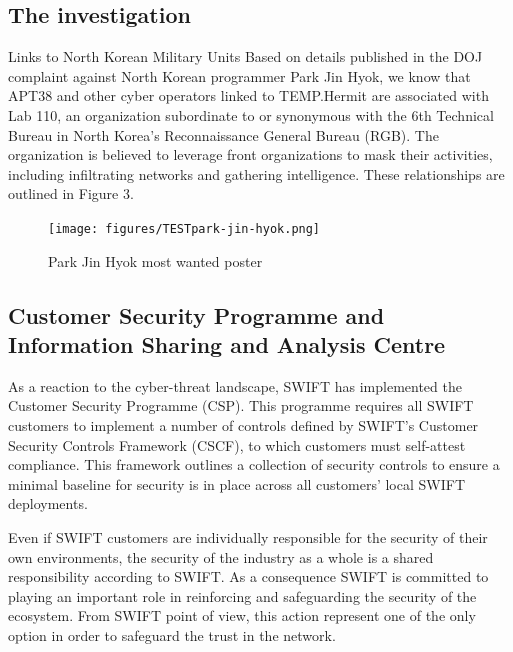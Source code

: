 \documentclass[12pt]{article}
\begin{document}
         \cite{}\cite{}\cite{}

        \subsection{The investigation}
        
        Links to North Korean Military Units
        Based on details published in the DOJ complaint against North Korean programmer Park Jin Hyok, we know that APT38 and other cyber operators linked to TEMP.Hermit are associated with Lab 110, an organization subordinate to or synonymous with the 6th Technical Bureau in North Korea's Reconnaissance General Bureau (RGB). The organization is believed to leverage front organizations to mask their activities, including infiltrating networks and gathering intelligence. These relationships are outlined in Figure 3.
        
         \cite{}\cite{}\cite{}
         
        \begin{figure}[H]
        \centering
        \texttt{[image: figures/TESTpark-jin-hyok.png]}
        \caption{Park Jin Hyok most wanted poster}
        \label{fig:structure}
        \end{figure}
       
        \subsection{Customer Security Programme and Information Sharing and Analysis Centre}
        
        As a reaction to the cyber-threat landscape, SWIFT has implemented the Customer Security Programme (CSP). This programme requires all SWIFT customers to implement a number of controls defined by SWIFT’s Customer Security Controls Framework (CSCF), to which customers must self-attest compliance. This framework outlines a collection of security controls to ensure a minimal baseline for security is in place across all customers’ local SWIFT deployments.
        
        Even if SWIFT customers are individually responsible for the security of their own environments, the security of the industry as a whole is a shared responsibility according to SWIFT. As a consequence SWIFT is committed to playing an important role in reinforcing and safeguarding the security of the ecosystem. From SWIFT point of view, this action represent one of the only option in order to safeguard the trust in the network. 
        
\end{document}
